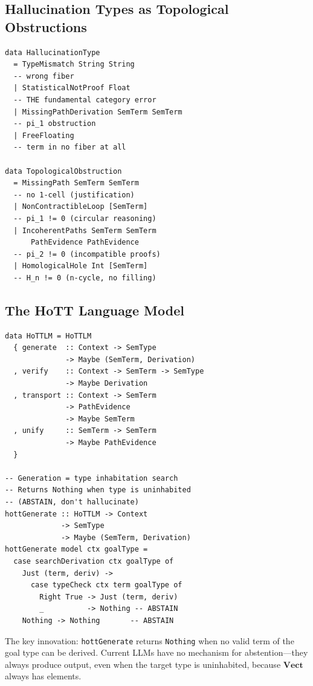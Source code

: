 \documentclass[11pt,a4paper,twocolumn]{article}
\theoremstyle{plain}
\theoremstyle{definition}
\newcommand{\Vect}{\mathbf{Vect}}
\begin{document}
\subsection{Hallucination Types as Topological Obstructions}

\begin{lstlisting}
data HallucinationType
  = TypeMismatch String String
  -- wrong fiber
  | StatisticalNotProof Float
  -- THE fundamental category error
  | MissingPathDerivation SemTerm SemTerm
  -- pi_1 obstruction
  | FreeFloating
  -- term in no fiber at all

data TopologicalObstruction
  = MissingPath SemTerm SemTerm
  -- no 1-cell (justification)
  | NonContractibleLoop [SemTerm]
  -- pi_1 != 0 (circular reasoning)
  | IncoherentPaths SemTerm SemTerm
      PathEvidence PathEvidence
  -- pi_2 != 0 (incompatible proofs)
  | HomologicalHole Int [SemTerm]
  -- H_n != 0 (n-cycle, no filling)
\end{lstlisting}

\subsection{The HoTT Language Model}

\begin{lstlisting}
data HoTTLM = HoTTLM
  { generate  :: Context -> SemType
              -> Maybe (SemTerm, Derivation)
  , verify    :: Context -> SemTerm -> SemType
              -> Maybe Derivation
  , transport :: Context -> SemTerm
              -> PathEvidence
              -> Maybe SemTerm
  , unify     :: SemTerm -> SemTerm
              -> Maybe PathEvidence
  }

-- Generation = type inhabitation search
-- Returns Nothing when type is uninhabited
-- (ABSTAIN, don't hallucinate)
hottGenerate :: HoTTLM -> Context
             -> SemType
             -> Maybe (SemTerm, Derivation)
hottGenerate model ctx goalType =
  case searchDerivation ctx goalType of
    Just (term, deriv) ->
      case typeCheck ctx term goalType of
        Right True -> Just (term, deriv)
        _          -> Nothing -- ABSTAIN
    Nothing -> Nothing       -- ABSTAIN
\end{lstlisting}

The key innovation: \texttt{hottGenerate} returns \texttt{Nothing} when no valid term of the goal type can be derived. Current LLMs have no mechanism for abstention---they always produce output, even when the target type is uninhabited, because $\Vect$ always has elements.
\end{document}
